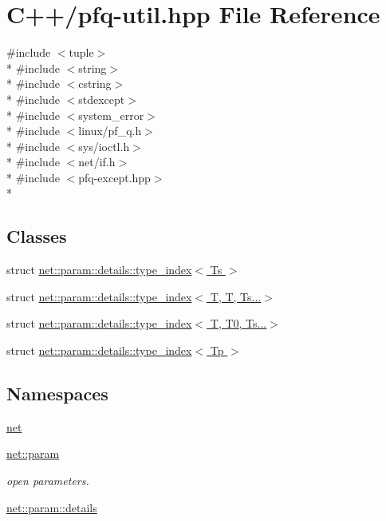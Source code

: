 \hypertarget{pfq-util_8hpp}{\section{C++/pfq-\/util.hpp File Reference}
\label{pfq-util_8hpp}
}
{\ttfamily \#include $<$tuple$>$}\\*
{\ttfamily \#include $<$string$>$}\\*
{\ttfamily \#include $<$cstring$>$}\\*
{\ttfamily \#include $<$stdexcept$>$}\\*
{\ttfamily \#include $<$system\-\_\-error$>$}\\*
{\ttfamily \#include $<$linux/pf\-\_\-q.\-h$>$}\\*
{\ttfamily \#include $<$sys/ioctl.\-h$>$}\\*
{\ttfamily \#include $<$net/if.\-h$>$}\\*
{\ttfamily \#include $<$pfq-\/except.\-hpp$>$}\\*
\subsection*{Classes}
\begin{DoxyCompactItemize}
\item 
struct \hyperlink{structnet_1_1param_1_1details_1_1type__index}{net\-::param\-::details\-::type\-\_\-index$<$ Ts $>$}
\item 
struct \hyperlink{structnet_1_1param_1_1details_1_1type__index_3_01T_00_01T_00_01Ts_8_8_8_4}{net\-::param\-::details\-::type\-\_\-index$<$ T, T, Ts...$>$}
\item 
struct \hyperlink{structnet_1_1param_1_1details_1_1type__index_3_01T_00_01T0_00_01Ts_8_8_8_4}{net\-::param\-::details\-::type\-\_\-index$<$ T, T0, Ts...$>$}
\item 
struct \hyperlink{structnet_1_1param_1_1details_1_1type__index_3_01Tp_01_4}{net\-::param\-::details\-::type\-\_\-index$<$ Tp $>$}
\end{DoxyCompactItemize}
\subsection*{Namespaces}
\begin{DoxyCompactItemize}
\item 
\hyperlink{namespacenet}{net}
\item 
\hyperlink{namespacenet_1_1param}{net\-::param}
\begin{DoxyCompactList}\small\item\em open parameters. \end{DoxyCompactList}\item 
\hyperlink{namespacenet_1_1param_1_1details}{net\-::param\-::details}
\end{DoxyCompactItemize}
